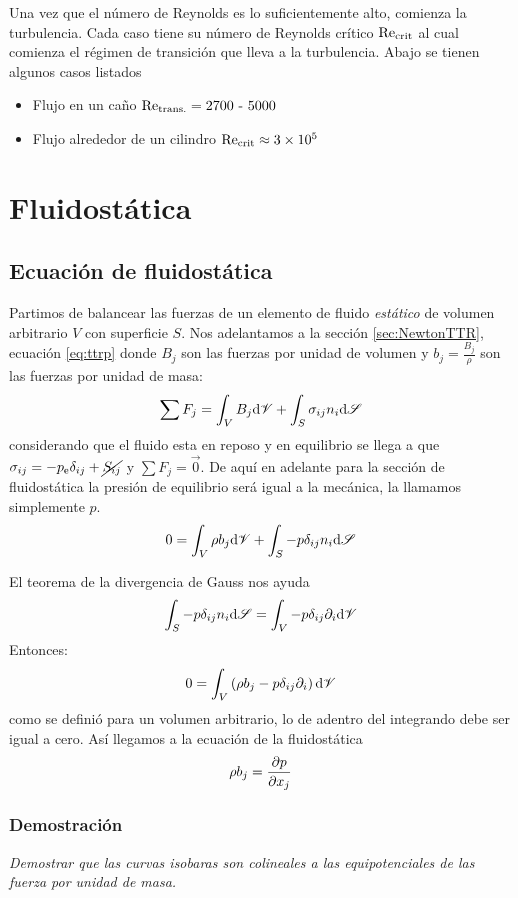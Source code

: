 Una vez que el número de Reynolds es lo suficientemente alto, comienza la turbulencia. Cada caso tiene su número de Reynolds crítico $\textrm{Re}_{\textrm{crit}}$ al cual comienza el régimen de transición que lleva a la turbulencia. Abajo se tienen algunos casos listados
\begin{itemize}
    \item Flujo en un caño $\textrm{Re}_\textrm{trans.}=2700\mbox{ - }5000$
    \item Flujo alrededor de un cilindro $\textrm{Re}_{\textrm{crit}} \approx \num{3e5}$
\end{itemize}


\section{Fluidostática}
\subsection{Ecuación de fluidostática}
Partimos de balancear las fuerzas de un elemento de fluido \textit{estático} de volumen arbitrario $V$ con superficie $S$. Nos adelantamos a la sección \ref{sec:NewtonTTR}, ecuación \ref{eq:ttrp} donde $B_j$ son las fuerzas por unidad de volumen y $b_j=\frac{B_j}{\rho}$ son las fuerzas por unidad de masa:
\[
\sum F_j = \int_V B_j \textrm{d} \mathscr{V} + \int_S \sigma_{ij} n_i \textrm{d} \mathscr{S}
\]
considerando que el fluido esta en reposo y en equilibrio se llega a que $\sigma_{ij}=-\pe \delta_{ij}+\cancel{S_{ij}}$ y $\sum F_j=\vec{0}$. De aquí en adelante para la sección de fluidostática la presión de equilibrio será igual a la mecánica, la llamamos simplemente $p$.
\[
0=\int_V \rho b_j \textrm{d} \mathscr{V} + \int_S -p\delta_{ij}n_i \textrm{d} \mathscr{S}
\]

El teorema de la divergencia de Gauss nos ayuda
\[
\int_S -p\delta_{ij}n_i \textrm{d} \mathscr{S} = \int_V -p \delta_{ij}\partial_i \textrm{d} \mathscr{V}
\]
Entonces:
\[
0=\int_V \left(\rho b_j - p\delta_{ij}\partial_i\right) \textrm{d} \mathscr{V}
\]
como se definió para un volumen arbitrario, lo de adentro del integrando debe ser igual a cero. Así llegamos a la ecuación de la fluidostática
\begin{equation} \label{eq:fluidostatica}
    \rho b_j = \frac{\partial p}{\partial x_j}
\end{equation}

\subsubsection*{Demostración}
\textit{Demostrar que las curvas isobaras son colineales a las equipotenciales de las fuerza por unidad de masa.}

